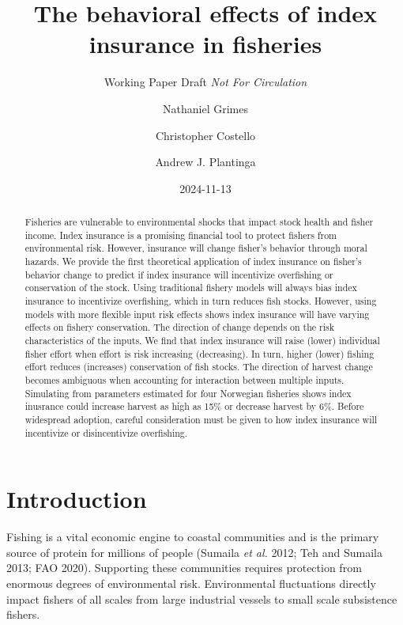 \documentclass[
  letterpaper,
  DIV=11,
  numbers=noendperiod]{scrartcl}
\title{The behavioral effects of index insurance in fisheries}
\subtitle{Working Paper Draft \emph{Not For Circulation}}
\author{Nathaniel Grimes \and Christopher Costello \and Andrew J.
Plantinga}
\date{2024-11-13}
\renewcommand*\contentsname{Table of contents}
\newcommand\contentsname{Table of contents}
\theoremstyle{plain}
\theoremstyle{plain}
\theoremstyle{remark}
\begin{document}
\maketitle
\begin{abstract}
Fisheries are vulnerable to environmental shocks that impact stock
health and fisher income. Index insurance is a promising financial tool
to protect fishers from environmental risk. However, insurance will
change fisher's behavior through moral hazards. We provide the first
theoretical application of index insurance on fisher's behavior change
to predict if index insurance will incentivize overfishing or
conservation of the stock. Using traditional fishery models will always
bias index insurance to incentivize overfishing, which in turn reduces
fish stocks. However, using models with more flexible input risk effects
shows index insurance will have varying effects on fishery conservation.
The direction of change depends on the risk characteristics of the
inputs. We find that index insurance will raise (lower) individual
fisher effort when effort is risk increasing (decreasing). In turn,
higher (lower) fishing effort reduces (increases) conservation of fish
stocks. The direction of harvest change becomes ambiguous when
accounting for interaction between multiple inputs. Simulating from
parameters estimated for four Norwegian fisheries shows index inusrance
could increase harvest as high as 15\% or decrease harvest by 6\%.
Before widespread adoption, careful consideration must be given to how
index insurance will incentivize or disincentivize overfishing.
\end{abstract}
\ifdefined\Shaded\renewenvironment{Shaded}{\begin{tcolorbox}[interior hidden, enhanced, sharp corners, frame hidden, boxrule=0pt, borderline west={3pt}{0pt}{shadecolor}, breakable]}{\end{tcolorbox}}\fi

\renewcommand*\contentsname{Table of contents}
{
\hypersetup{linkcolor=}
\setcounter{tocdepth}{3}
\tableofcontents
}
\hypertarget{introduction}{%
\section{Introduction}\label{introduction}}

Fishing is a vital economic engine to coastal communities and is the
primary source of protein for millions of people (Sumaila \emph{et al.}
2012; Teh and Sumaila 2013; FAO 2020). Supporting these communities
requires protection from enormous degrees of environmental risk.
Environmental fluctuations directly impact fishers of all scales from
large industrial vessels to small scale subsistence fishers.
\end{document}
